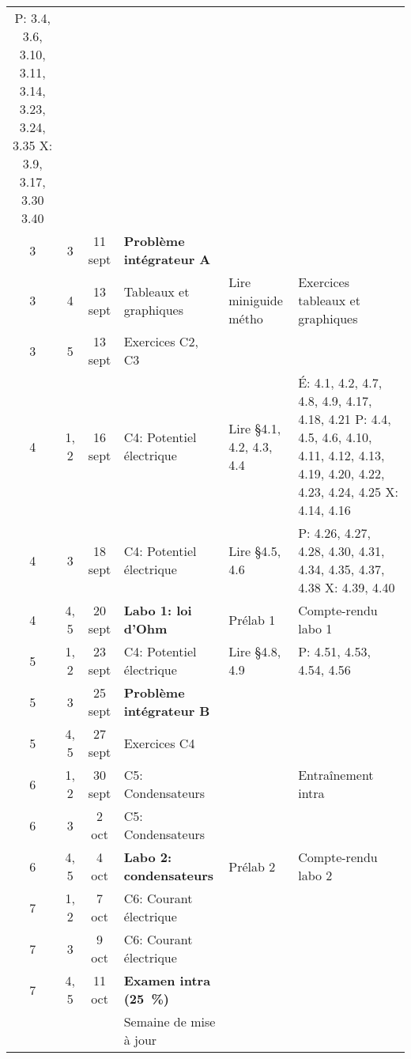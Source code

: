 \documentclass[10pt]{article}
\begin{document}
\begin{longtable}{cccp{6cm}lp{9cm}}
       P: 3.4, 3.6, 3.10, 3.11, 3.14, 3.23, 3.24, 3.35 \newline
       X: 3.9, 3.17, 3.30 3.40  \\
  3     &  3     &  11 sept  &  \textbf{Problème intégrateur A}  \\
  3     &  4     &  13 sept   &  Tableaux et graphiques
    & Lire miniguide métho
    & Exercices tableaux et graphiques  \\
  3     &  5     &  13 sept   &  Exercices C2, C3  \\
  \midrule
  4     &  1, 2  &  16 sept   &  C4: Potentiel électrique
    & Lire \S 4.1, 4.2, 4.3, 4.4
    & É: 4.1, 4.2, 4.7, 4.8, 4.9, 4.17, 4.18, 4.21  \newline 
      P: 4.4, 4.5, 4.6, 4.10, 4.11, 4.12, 4.13, 4.19, 4.20, 4.22, 4.23, 4.24, 4.25 \newline 
      X: 4.14, 4.16 \newline \\
  4     &  3     &  18 sept   &  C4: Potentiel électrique
    & Lire \S 4.5, 4.6
    & P: 4.26, 4.27, 4.28, 4.30, 4.31, 4.34, 4.35, 4.37, 4.38 \newline
      X: 4.39, 4.40 \\
  4     &  4, 5  &  20 sept   &  \textbf{Labo 1: loi d'Ohm}
    &  Prélab 1  &  Compte-rendu labo 1 \\
  \midrule
  5     &  1, 2  &  23 sept  &  C4: Potentiel électrique
    & Lire \S 4.8, 4.9
    & P: 4.51, 4.53, 4.54, 4.56  \\
  5     &  3     &  25 sept  &  \textbf{Problème intégrateur B}  \\
  5     &  4, 5  &  27 sept  &  Exercices C4
    &    &   \\
  \midrule
  6     &  1, 2  &  30 sept  &  C5: Condensateurs
    &  &  Entraînement intra  \\
  6     &  3     &  2 oct    &  C5: Condensateurs  \\
  6     &  4, 5  &  4 oct    &  \textbf{Labo 2: condensateurs}
    &  Prélab 2  &  Compte-rendu labo 2 \\
  \midrule
  7     &  1, 2  &  7 oct    &  C6: Courant électrique  \\
  7     &  3     &  9 oct    &  C6: Courant électrique  \\
  7     &  4, 5  &  11 oct   &  \textbf{Examen intra (\qty{25}{\percent})}
    &    &   \\
  \midrule
        &        &           &  Semaine de mise à jour  \\
  \midrule

\end{longtable}
\end{document}
